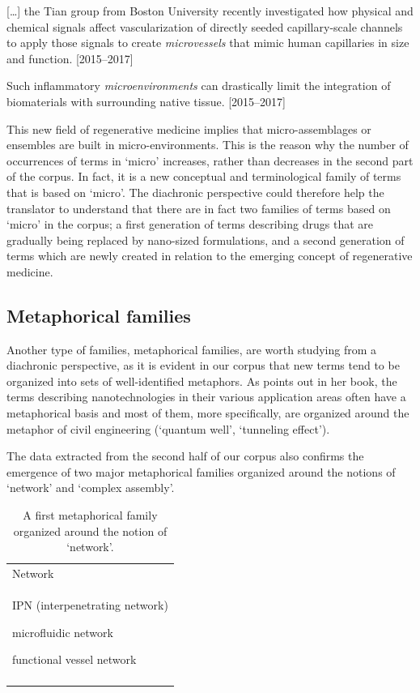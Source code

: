 \documentclass[output=paper]{langscibook}
\begin{document}
\ea%
    \label{ex:key:20}
         […] the Tian group from Boston University recently investigated how physical and chemical signals affect vascularization of directly seeded capillary-scale channels to apply those signals to create \textit{microvessels} that mimic human capillaries in size and function. [2015–2017]
\z

\ea%
    \label{ex:key:21}
         Such inflammatory \textit{microenvironments} can drastically limit the integration of biomaterials with surrounding native tissue. [2015–2017]
\z

This new field of regenerative medicine implies that micro-assemblages or ensembles are built in micro-environments. This is the reason why the number of occurrences of terms in ‘micro’ increases, rather than decreases in the second part of the corpus. In fact, it is a new conceptual and terminological family of terms that is based on ‘micro’. The diachronic perspective could therefore help the translator to understand that there are in fact two families of terms based on ‘micro’ in the corpus; a first generation of terms describing drugs that are gradually being replaced by nano-sized formulations, and a second generation of terms which are newly created in relation to the emerging concept of regenerative medicine.

\subsection{Metaphorical families}\label{sec:cuchet:3.4}

Another type of families, metaphorical families, are worth studying from a diachronic perspective, as it is evident in our corpus that new terms tend to be organized into sets of well-identified metaphors. As \citet{Fries2016} points out in her book, the terms describing nanotechnologies in their various application areas often have a metaphorical basis and most of them, more specifically, are organized around the metaphor of civil engineering (‘quantum well’, ‘tunneling effect’).

The data extracted from the second half of our corpus also confirms the emergence of two major metaphorical families organized around the notions of ‘network’ and ‘complex assembly’.

\begin{table}
\begin{tabularx}{.8\textwidth}{X}
\lsptoprule
{{{Network} }}\\
IPN (interpenetrating network)

microfluidic network

functional vessel network\\
\lspbottomrule
\end{tabularx}
\caption{A first metaphorical family organized around the notion of ‘network’.}
\label{tab:key:6}
\end{table}
\end{document}
